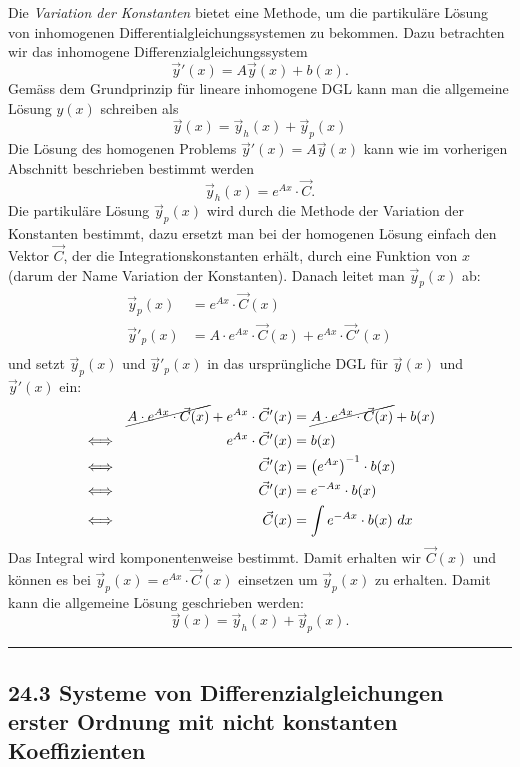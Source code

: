\documentclass[a4paper,landscape,8pt]{extarticle}
\newcommand{\sep}{\vspace{5pt}\noindent\hrule\vspace{5pt}}
\begin{document}
\begin{multicols*}{4}
Die \emph{Variation der Konstanten} bietet eine Methode, um die partikuläre
Lösung von inhomogenen Differentialgleichungssystemen zu bekommen. Dazu
betrachten wir das inhomogene Differenzialgleichungssystem
\[
\vec{y}'(x) = A\vec{y}(x) + b(x).
\]
Gemäss dem Grundprinzip für lineare inhomogene DGL kann man die allgemeine
Lösung $y(x)$ schreiben als
\[
\vec{y}(x) = \vec{y}_h(x) + \vec{y}_p(x)
\]
Die Lösung des homogenen Problems $\vec{y}'(x) = A\vec{y}(x)$ kann wie im
vorherigen Abschnitt beschrieben bestimmt werden
\[
\vec{y}_h(x) = e^{Ax}\cdot \vec{C}.
\]
Die partikuläre Lösung $\vec{y}_p(x)$ wird durch die Methode der Variation der
Konstanten bestimmt, dazu ersetzt man bei der homogenen Lösung einfach den
Vektor $\vec{C}$, der die Integrationskonstanten erhält, durch eine Funktion von
$x$ (darum der Name Variation der Konstanten). Danach leitet man $\vec{y}_p(x)$
ab:
\begin{align*}
\vec{y}_p(x) &= e^{Ax}\cdot \vec{C}(x)\\
\vec{y}'_p(x) &= A\cdot e^{Ax}\cdot \vec{C}(x) + e^{Ax}\cdot \vec{C}'(x)\\
\end{align*}
und setzt $\vec{y}_p(x)$ und $\vec{y}'_p(x)$ in das ursprüngliche DGL für
$\vec{y}(x)$ und $\vec{y}'(x)$ ein:
\begin{align*}
& &\cancel{A\cdot e^{Ax}\cdot \vec{C}(x)} + e^{Ax}\cdot \vec{C}'(x) &=
\cancel{A\cdot e^{Ax}\cdot \vec{C}(x)} + b(x)\\
& \Longleftrightarrow &e^{Ax}\cdot \vec{C}'(x) &= b(x)\\
& \Longleftrightarrow & \vec{C}'(x) &= \left(e^{Ax}\right)^{-1}\cdot b(x)\\
& \Longleftrightarrow & \vec{C}'(x) &= e^{-Ax}\cdot b(x)\\
& \Longleftrightarrow & \vec{C}(x) &= \int e^{-Ax}\cdot b(x) \ dx\\
\end{align*}
Das Integral wird komponentenweise bestimmt. Damit erhalten wir $\vec{C}(x)$ und
können es bei $\vec{y}_p(x)=e^{Ax}\cdot \vec{C}(x)$ einsetzen um $\vec{y}_p(x)$
zu erhalten. Damit kann die allgemeine Lösung geschrieben werden:
\[
\vec{y}(x) = \vec{y}_h(x) + \vec{y}_p(x).
\]

\sep

\subsection{24.3 Systeme von Differenzialgleichungen erster Ordnung mit nicht
konstanten Koeffizienten}


\end{multicols*}
\end{document}
